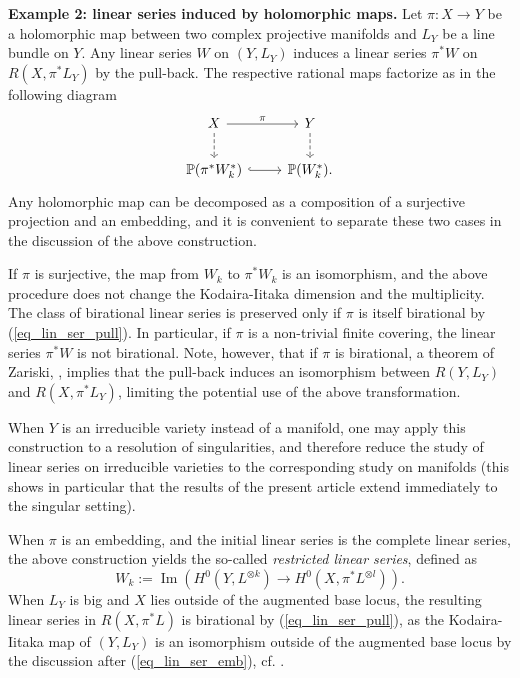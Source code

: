 \documentclass[12pt]{article}
\numberwithin{equation}{section}
\theoremstyle{theorem}
\theoremstyle{definition}
\theoremstyle{remark}
\renewcommand{\Im}{\operatorname{Im}}
\begin{document}
	\par 
	\textbf{Example 2: linear series induced by holomorphic maps.}
	Let $\pi : X \to Y$ be a holomorphic map between two complex projective manifolds and $L_Y$ be a line bundle on $Y$.
	Any linear series $W$ on $(Y, L_Y)$ induces a linear series $\pi^* W$ on $R(X, \pi^* L_Y)$ by the pull-back.
	The respective rational maps factorize as in the following diagram
	\begin{equation}\label{eq_lin_ser_pull}
		\begin{tikzcd}
		X \arrow[r, "\pi"] \arrow[d, dashed] & Y \arrow[d, dashed] \\
\mathbb{P}(\pi^* W_k^*)  \arrow[r, hook] & \mathbb{P}(W_k^*).
		\end{tikzcd}
	\end{equation}
	Any holomorphic map can be decomposed as a composition of a surjective projection and an embedding, and it is convenient to separate these two cases in the discussion of the above construction.
	\par 
	If $\pi$ is surjective, the map from $W_k$ to $\pi^* W_k$ is an isomorphism, and the above procedure does not change the Kodaira-Iitaka dimension and the multiplicity.
	The class of birational linear series is preserved only if $\pi$ is itself birational by (\ref{eq_lin_ser_pull}). In particular, if $\pi$ is a non-trivial finite covering, the linear series $\pi^* W$ is not birational.
	Note, however, that if $\pi$ is birational, a theorem of Zariski, \cite[Corollary III.11.4]{HartsBook}, implies that the pull-back induces an isomorphism between $R(Y, L_Y)$ and $R(X, \pi^* L_Y)$, limiting the potential use of the above transformation.
	\par 
	When $Y$ is an irreducible variety instead of a manifold, one may apply this construction to a resolution of singularities, and therefore reduce the study of linear series on irreducible varieties to the corresponding study on manifolds (this shows in particular that the results of the present article extend immediately to the singular setting).
	\par 
	When $\pi$ is an embedding, and the initial linear series is the complete linear series, the above construction yields the so-called \textit{restricted linear series}, defined as
	\begin{equation}
		W_k := \Im (H^0(Y, L^{\otimes k}) \to H^0(X, \pi^* L^{\otimes l})).
	\end{equation}
	When $L_Y$ is big and $X$ lies outside of the augmented base locus, the resulting linear series in $R(X, \pi^* L)$ is birational by (\ref{eq_lin_ser_pull}), as the Kodaira-Iitaka map of $(Y, L_Y)$ is an isomorphism outside of the augmented base locus by the discussion after (\ref{eq_lin_ser_emb}), cf. \cite[Lemma 2.16]{LazMus}.
\end{document}
